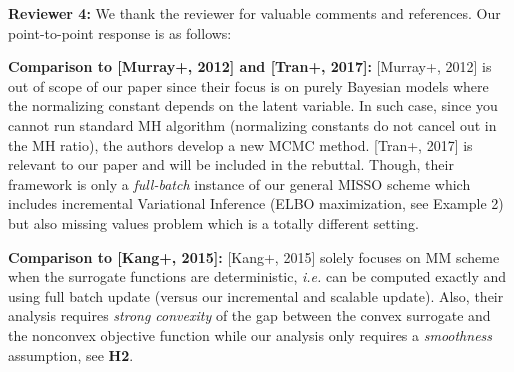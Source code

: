 \documentclass{article}
\begin{document}
\textbf{\textcolor{green!50!black}{Reviewer 4:}} We thank the reviewer for valuable comments and references. Our point-to-point response is as follows:

\textbf{Comparison to [Murray+, 2012] and [Tran+, 2017]:} 
[Murray+, 2012] is out of scope of our paper since their focus is on purely Bayesian models where the normalizing constant depends on the latent variable.
In such case, since you cannot run standard MH algorithm (normalizing constants do not cancel out in the MH ratio), the authors develop a new MCMC method.
[Tran+, 2017] is relevant to our paper and will be included in the rebuttal. 
Though, their framework is only a \emph{full-batch} instance of our general MISSO scheme which includes incremental Variational Inference (ELBO maximization, see Example 2) but also missing values problem which is a totally different setting.

\textbf{Comparison to [Kang+, 2015]:} 
[Kang+, 2015] solely focuses on MM scheme when the surrogate functions are deterministic, \textit{i.e.} can be computed exactly and using full batch update (versus our incremental and scalable update).
Also, their analysis requires \emph{strong convexity} of the gap between the convex surrogate and the nonconvex objective function while our analysis only requires a \emph{smoothness} assumption, see \textbf{H2}.

\end{document}
